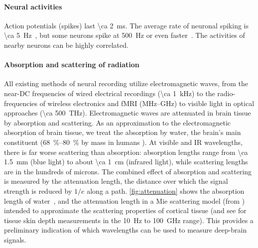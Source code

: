 \paragraph{Neural activities}
Action potentials (spikes) last \SI{\ca 2}{\milli\second}.
The average rate of neuronal spiking is \SI{\ca 5}{\hertz}~\cite{sarpeshkar10}, but some neurons spike at \SI{500}{\hertz} or even faster~\cite{gittis10}.
The activities of nearby neurons can be highly correlated.

\paragraph{Absorption and scattering of radiation}
All existing methods of neural recording utilize electromagnetic waves, from the near-DC frequencies of wired electrical recordings (\SI{\ca 1}{\kilo\hertz}) to the radio-frequencies of wireless electronics and fMRI (MHz--GHz) to visible light in optical approaches (\SI{\ca 500}{\tera\hertz}).
Electromagnetic waves are attenuated in brain tissue by absorption and scattering.
As an approximation to the electromagnetic absorption of brain tissue, we treat the absorption by water, the brain's main constituent (\SIrange{68}{80}{\percent} by mass in humans \cite{dobbing73,fatouros99}).
At visible and IR wavelengths, there is far worse scattering than absorption: absorption lengths range from \SI{\ca 1.5}{\milli\meter} (blue light) to about \SI{\ca 1}{\centi\meter} (infrared light), while scattering lengths are in the hundreds of microns.
The combined effect of absorption and scattering is measured by the attenuation length, the distance over which the signal strength is reduced by $1/e$ along a path.
\autoref{fig:attenuation} shows the absorption length of water~\cite{kou93}, and the attenuation length in a Mie scattering model (from \cite{horton13}) intended to approximate the scattering properties of cortical tissue (and see \cite{gabriel1996} for tissue skin depth measurements in the \SI{10}{\hertz} to \SI{100}{\giga\hertz} range).
This provides a preliminary indication of which wavelengths can be used to measure deep-brain signals.


